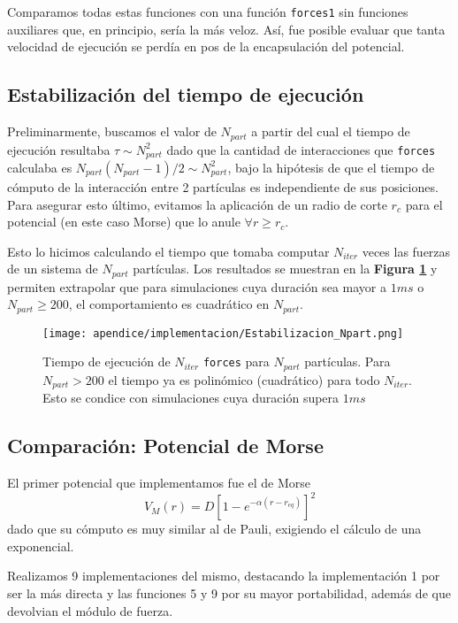 Comparamos todas estas funciones con una función \texttt{forces1} sin funciones auxiliares que, en principio, sería la más veloz. Así, fue posible evaluar que tanta velocidad de ejecución se perdía en pos de 
la encapsulación del potencial. 

\subsection{Estabilización del tiempo de ejecución}

Preliminarmente, buscamos el valor de $N_{part}$ a partir del cual el tiempo de ejecución resultaba $\tau\sim N_{part}^2$ dado que la cantidad de interacciones que \texttt{forces} calculaba es 
$N_{part}(N_{part}-1)/2\sim N_{part}^2$, bajo la hipótesis de que el tiempo de cómputo de la interacción entre 2 partículas es independiente de sus posiciones. 
Para asegurar esto último, evitamos la aplicación de un radio de corte $r_c$ para el potencial (en este caso Morse) que lo anule $\forall r\geq r_c$.

Esto lo hicimos calculando el tiempo que tomaba computar $N_{iter}$ veces las fuerzas de un sistema de $N_{part}$ partículas. 
Los resultados se muestran en la \textbf{Figura \ref{fig:TvsNpart}} y permiten extrapolar que para simulaciones cuya duración sea mayor a $1ms$ o $N_{part}\geq200$, el comportamiento es cuadrático en $N_{part}$.

\begin{figure}[h]
	\centering
	\texttt{[image: apendice/implementacion/Estabilizacion\_Npart.png]}
	\caption{Tiempo de ejecución de $N_{iter}$ \texttt{forces} para $N_{part}$ partículas. Para $N_{part}>200$ el tiempo ya es polinómico (cuadrático) para todo $N_{iter}$. 
	Esto se condice con simulaciones cuya duración supera $1ms$}
	\label{fig:TvsNpart}
\end{figure}

\subsection{Comparación: Potencial de Morse}

El primer potencial que implementamos fue el de Morse
\[ V_{M} (r) = D\left[1-e^{-\alpha (r-r_{eq})}\right]^2\]
dado que su cómputo es muy similar al de Pauli, exigiendo el cálculo de una exponencial.

Realizamos 9 implementaciones del mismo, destacando la implementación 1 por ser la más directa y las funciones 5 y 9 por su mayor portabilidad, además de que devolvian el módulo de fuerza.

